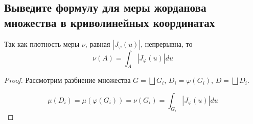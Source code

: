
\subsection{Выведите формулу для меры жорданова множества в криволинейных координатах}

\begin{proposition*}
    Так как плотность меры $\nu$, равная $|J_\varphi(u)|$, непрерывна, то
    \begin{equation*}
        \nu(A) = \int_A |J_\varphi(u)| du
    \end{equation*}    
\end{proposition*}
\begin{proof}
    Рассмотрим разбиение множества $G = \bigsqcup G_i$, $D_i = \varphi(G_i)$, $D = \bigsqcup D_i$. 

    \begin{equation*}
        \mu(D_i) = \mu(\varphi(G_i)) = \nu(G_i) = \int_{G_i} |J_\varphi(u)| du
    \end{equation*}
\end{proof}
